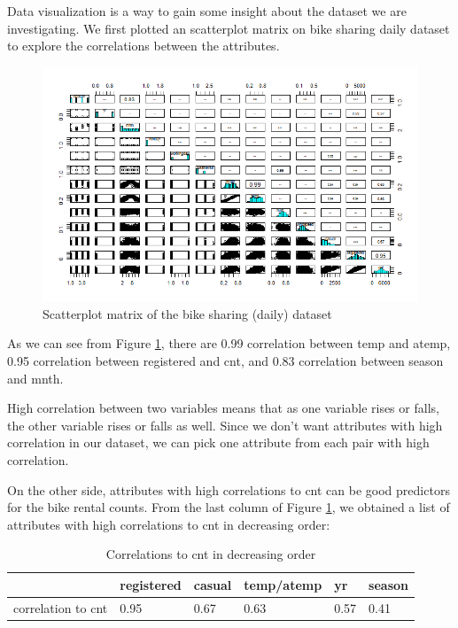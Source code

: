 \documentclass[12pt]{article}
\begin{document}
	Data visualization is a way to gain some insight about the dataset we are investigating. We first plotted an scatterplot matrix on bike sharing daily dataset to explore the correlations between the attributes.
	\begin{figure}[H]
		\includegraphics[scale=0.6]{figures/scatterplot.png}
		\caption{Scatterplot matrix of the bike sharing (daily) dataset}
		\label{fig:scatterplot}
	\end{figure}
	
	As we can see from Figure \ref{fig:scatterplot}, there are 0.99 correlation between temp and atemp, 0.95 correlation between registered and cnt, and 0.83 correlation between season and mnth.
	
	High correlation between two variables means that as one variable rises or falls, the other variable rises or falls as well. Since we don't want attributes with high correlation in our dataset, we can pick one attribute from each pair with high correlation.
	
	On the other side, attributes with high correlations to cnt can be good predictors for the bike rental counts. From the last column of Figure \ref{fig:scatterplot}, we obtained a list of attributes with high correlations to cnt in decreasing order: 
	\begin{table}[H]
		\centering
		\begin{tabular}{| l | l | l | l | l | l|}
			\hline
			& registered & casual & temp/atemp & yr & season\\
			\hline
			 correlation to cnt& 0.95 & 0.67 & 0.63 & 0.57 & 0.41\\
			\hline
		\end{tabular}
		\caption{Correlations to cnt in decreasing order}
	\end{table}
	
\end{document}
